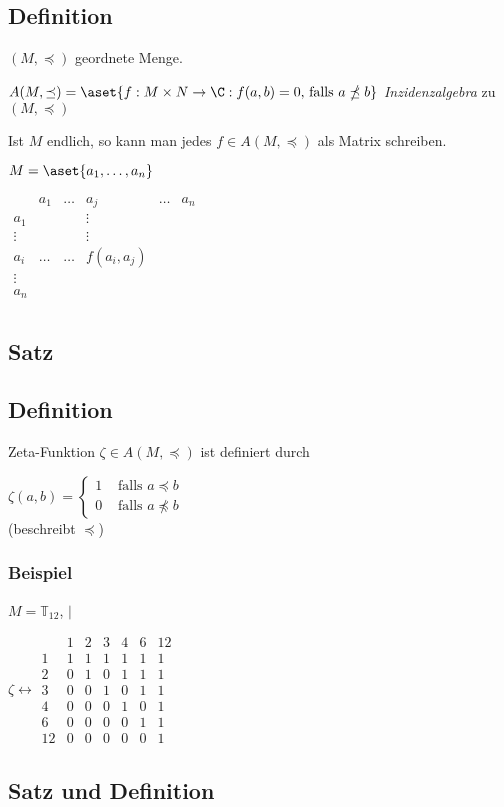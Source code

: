 	\subsection{Definition} %
	
	$(M, \preceq)$ geordnete Menge.
	
	$A(M, \preceq) = \aset{f : M \times N \to \C : f(a, b) = 0 \text{, falls } a \npreceq b}$ 
	\emph{Inzidenzalgebra} zu $(M, \preceq)$
	
	Ist $M$ endlich, so kann man jedes $f \in A(M, \preceq)$ als Matrix schreiben.
	
	$M = \aset{a_1, \dots, a_n}$
	
	$\begin{array}{c|ccccc}
			& a_1	& \dots & a_j 	& \dots & a_n \\\hline
	a_1  	&		&		&\vdots	\\
	\vdots  &		&		&\vdots \\
	a_i		&\dots 	& \dots & f(a_i, a_j) \\
	\vdots  & \\
	a_n		& \\
	\end{array}$
	
\subsection{Satz} %

\subsection{Definition} %

Zeta-Funktion $\zeta \in A(M, \preceq)$  ist definiert durch

$\zeta(a, b) = \begin{cases}
1 & \text{ falls } a \preceq b \\
0 & \text{ falls } a \npreceq b
\end{cases}$
\\ (beschreibt $\preceq$)

\subsubsection*{Beispiel}

$M = \mathbb{T}_{12}$, $|$

$\zeta \leftrightarrow
%
\begin{array}{c|cccccc|}
	& 1 & 2 & 3 & 4 & 6 & 12 \\\hline
1	& 1 & 1 & 1 & 1 & 1 & 1 \\
2 	& 0 & 1 & 0 & 1 & 1 & 1 \\
3 	& 0 & 0 & 1 & 0 & 1 & 1 \\
4	& 0 & 0 & 0 & 1 & 0 & 1 \\
6	& 0 & 0 & 0 & 0 & 1 & 1 \\
12 	& 0 & 0 & 0 & 0 & 0 & 1
\end{array}
%
$

\subsection{Satz und Definition} %










